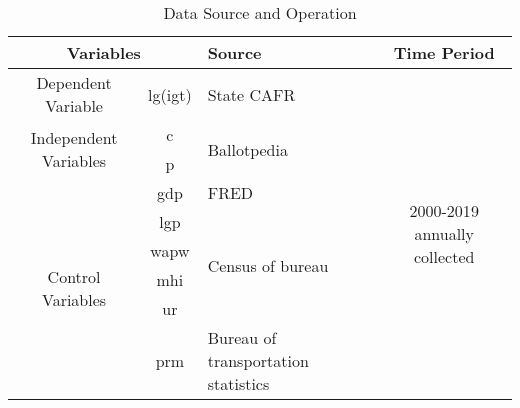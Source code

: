 \clearpage

\begin{table}[htbp]
    \centering
    \caption{Data Source and Operation}
    \begin{tabular}{ccp{8.785em}c}
        \toprule
        \multicolumn{2}{p{13.93em}}{Variables }                                         & Source  & \multicolumn{1}{p{7.785em}}{Time Period}                                                                         \\
        \midrule
        \multicolumn{1}{p{7em}}{Dependent Variable}                                     & lg(igt) & State CAFR                               & \multicolumn{1}{c}{\multirow{9}[18]{*}{2000-2019 annually collected}} \\
        \cmidrule{1-3}    \multicolumn{1}{c}{\multirow{2}[4]{*}{Independent Variables}} & c       & \multirow{2}[4]{*}{Ballotpedia}          &                                                                       \\
        \cmidrule{2-2}                                                                  & p       & \multicolumn{1}{c}{}                     &                                                                       \\
        \cmidrule{1-3}    \multicolumn{1}{c}{\multirow{6}[12]{*}{Control Variables}}    & gdp     & FRED                                     &                                                                       \\
        \cmidrule{2-3}                                                                  & lgp     & \multirow{4}[8]{*}{Census of bureau}     &                                                                       \\
        \cmidrule{2-2}                                                                  & wapw    & \multicolumn{1}{c}{}                     &                                                                       \\
        \cmidrule{2-2}                                                                  & mhi     & \multicolumn{1}{c}{}                     &                                                                       \\
        \cmidrule{2-2}                                                                  & ur      & \multicolumn{1}{c}{}                     &                                                                       \\
        \cmidrule{2-3}                                                                  & prm     & Bureau of transportation statistics      &                                                                       \\
        \bottomrule
    \end{tabular}%
    \label{Table A.1}%
\end{table}%

